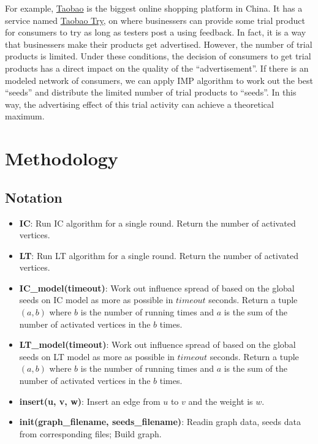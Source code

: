 \documentclass[lang=en,12pt]{elegantpaper}
\begin{document}
For example, \href{https://www.taobao.com}{Taobao} is the biggest online shopping platform in China.
It has a service named \href{https://try.taobao.com}{Taobao Try}, on where businessers can provide some trial product for consumers to try as long as testers post a using feedback.
In fact, it is a way that businessers make their products get advertised. However, the number of trial products is limited.
Under these conditions, the decision of consumers to get trial products has a direct impact on the quality of the ``advertisement''.
If there is an modeled network of consumers, we can apply IMP algorithm to work out the best ``seeds'' and distribute the limited number of trial products to ``seeds''.
In this way, the advertising effect of this trial activity can achieve a theoretical maximum.

\section{Methodology}
\subsection{Notation}
\begin{itemize}
  \item \textbf{IC}: Run IC algorithm for a single round. Return the number of activated vertices.
  \item \textbf{LT}: Run LT algorithm for a single round. Return the number of activated vertices.
  \item \textbf{IC\_model(timeout)}: Work out influence spread of based on the global seeds on IC model as more as possible in $timeout$ seconds.
  Return a tuple $(a, b)$ where $b$ is the number of running times and $a$ is the sum of the number of activated vertices in the $b$ times.
  \item \textbf{LT\_model(timeout)}: Work out influence spread of based on the global seeds on LT model as more as possible in $timeout$ seconds.
  Return a tuple $(a, b)$ where $b$ is the number of running times and $a$ is the sum of the number of activated vertices in the $b$ times.
  \item \textbf{insert(u, v, w)}: Insert an edge from $u$ to $v$ and the weight is $w$.
  \item \textbf{init(graph\_filename, seeds\_filename)}: Readin graph data, seeds data from corresponding files; Build graph.
\end{itemize}
\end{document}
